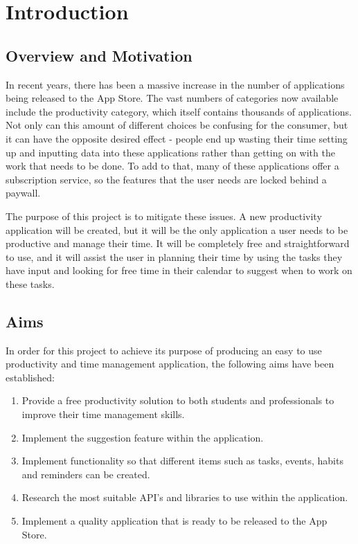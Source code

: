 \chapter{Introduction}
	\label{chap:intro}
	
    \section{Overview and Motivation}  
	\label{sec:intro_overview}
	    In recent years, there has been a massive increase in the number of applications being released to the App Store.  The vast numbers of categories now available include the productivity category, which itself contains thousands of applications.  Not only can this amount of different choices be confusing for the consumer, but it can have the opposite desired effect - people end up wasting their time setting up and inputting data into these applications rather than getting on with the work that needs to be done.  To add to that, many of these applications offer a subscription service, so the features that the user needs are locked behind a paywall.
	    
	    The purpose of this project is to mitigate these issues.  A new productivity application will be created, but it will be the only application a user needs to be productive and manage their time.  It will be completely free and straightforward to use, and it will assist the user in planning their time by using the tasks they have input and looking for free time in their calendar to suggest when to work on these tasks.
        
    \section{Aims}
	\label{sec:intro_aim}
	    In order for this project to achieve its purpose of producing an easy to use productivity and time management application, the following aims have been established:
	    \begin{enumerate}[noitemsep]
	        \item Provide a free productivity solution to both students and professionals to improve their time management skills.
	        \item Implement the suggestion feature within the application.
	        \item Implement functionality so that different items such as tasks, events, habits and reminders can be created.
	        \item Research the most suitable API's and libraries to use within the application.
	        \item Implement a quality application that is ready to be released to the App Store.
	    \end{enumerate}
	    
